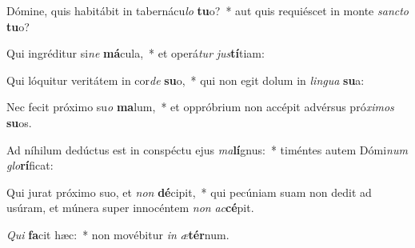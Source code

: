 \item Dómine, quis habitábit in tabernácu\textit{lo} \textbf{tu}o?~* aut quis requiéscet in monte \textit{sanc}\textit{to} \textbf{tu}o?
\item Qui ingréditur si\textit{ne} \textbf{má}cula,~* et operá\textit{tur} \textit{jus}\textbf{tí}tiam:
\item Qui lóquitur veritátem in cor\textit{de} \textbf{su}o,~* qui non egit dolum in \textit{lin}\textit{gua} \textbf{su}a:
\item Nec fecit próximo su\textit{o} \textbf{ma}lum,~* et oppróbrium non accépit advérsus pró\textit{xi}\textit{mos} \textbf{su}os.
\item Ad níhilum dedúctus est in conspéctu ejus \textit{ma}\textbf{lí}gnus:~* timéntes autem Dómi\textit{num} \textit{glo}\textbf{rí}ficat:
\item Qui jurat próximo suo, et \textit{non} \textbf{dé}cipit,~* qui pecúniam suam non dedit ad usúram, et múnera super innocéntem \textit{non} \textit{ac}\textbf{cé}pit.
\item \textit{Qui} \textbf{fa}cit hæc:~* non movébitur \textit{in} \textit{æ}\textbf{tér}num.
